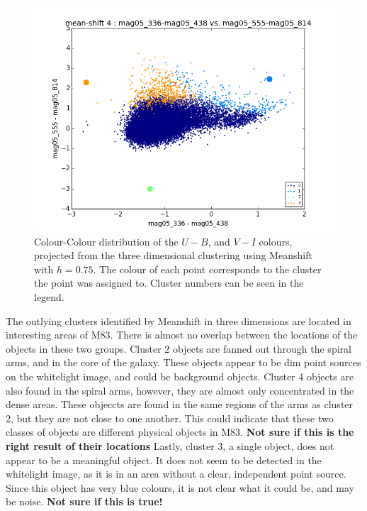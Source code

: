 \begin{figure}[H]
\centering
\includegraphics[width=\linewidth]{figs/meanshift_base_color_4cl_mag05_336-mag05_438vsmag05_555-mag05_814}
\caption{Colour-Colour distribution of the $U - B$, and $V - I$ colours, projected from the three dimensional clustering using Meanshift with $h=0.75$. The colour of each point corresponds to the cluster the point was assigned to. Cluster numbers can be seen in the legend.}
\label{fig:BB3dMS4p}
\end{figure}

The outlying clusters identified by Meanshift in three dimensions are located in interesting areas of M83.
There is almost no overlap between the locations of the objects in these two groups. 
Cluster 2 objects are fanned out through the spiral arms, and in the core of the galaxy.
These objects appear to be dim point sources on the whitelight image, and could be background objects. 
Cluster 4 objects are also found in the spiral arms, however, they are almost only concentrated in the dense areas. 
These objeccts are found in the same regions of the arms as cluster 2, but they are not close to one another. 
This could indicate that these two classes of objects are different physical objects in M83. \textbf{Not sure if this is the right result of their locations}
Lastly, cluster 3, a single object, does not appear to be a meaningful object. It does not seem to be detected in the whitelight image, as it is in an area without a clear, independent point source.
Since this object has very blue colours, it is not clear what it could be, and may be noise. \textbf{Not sure if this is true!}

